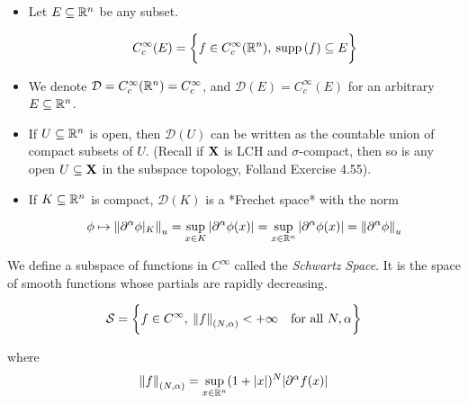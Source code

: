 \documentclass[../main-manifolds.tex]{subfiles}
\begin{document}
\newpage
{}
\begin{itemize}
    \item Let $E\subseteq {\mathbb{R}^n}$ be any subset.

    $$
    C_c^\infty(E) = \biggl\{{f\in C_c^\infty({\mathbb{R}^n}),\: \operatorname{supp}{(f)}\subseteq E}\biggr\}
    $$
    \item We denote $\mathcal{D} = C_c^\infty({\mathbb{R}^n}) = C_c^\infty$, and $\mathcal{D}(E) = C_c^\infty(E)$ for an arbitrary $E\subseteq{\mathbb{R}^n}$.
    \item If $U\subseteq{\mathbb{R}^n}$ is open, then $\mathcal{D}(U)$ can be written as the countable union of compact subsets of $U$. (Recall if ${\mathbf{X}}$ is LCH and $\sigma$-compact, then so is any open $U\subseteq {\mathbf{X}}$ in the subspace topology, Folland Exercise 4.55).
    \item If $K\subseteq{\mathbb{R}^n}$ is compact, $\mathcal{D}(K)$ is a *Frechet space* with the norm

    $$
    \phi\mapsto \norm{\partial^\alpha \phi\vert_{K}}_u = \sup_{x\in K}\vert \partial^\alpha \phi(x)\vert  = \sup_{x\in {\mathbb{R}^n}}\vert\partial^\alpha \phi(x)\vert = \norm{\partial^\alpha\phi}_u
    $$
\end{itemize}

\begin{definition}
We define a subspace of functions in $C^\infty$ called the \emph{Schwartz Space}. It is the space of smooth functions whose partials are rapidly decreasing.

\[
\mathcal{S} = \biggl\{{f\in C^\infty,\: \norm{f}_{(N,\alpha)}<+\infty \quad \text{for all }N,\alpha}\biggr\}
\]

where 
\[\norm{f}_{(N,\alpha)} = \sup_{x\in\mathbb{R}^{n}}(1 + \vert x\vert)^N\vert\partial^\alpha f(x)\vert\]
\end{definition}
\end{document}
